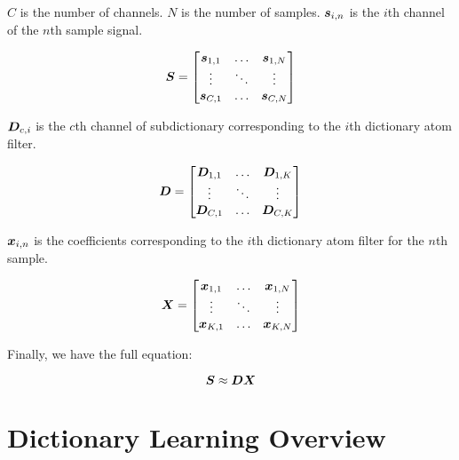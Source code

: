 \documentclass{article}
\begin{document}
$C$ is the number of channels.
$N$ is the number of samples.
$\bm{s}_{i,n}$ is the $i$th channel of the $n$th sample signal.

\begin{equation}
\begin{aligned}
\bm{S} = \begin{bmatrix} \bm{s}_{1,1} & \hdots & \bm{s}_{1,N} \\
                      \vdots & \ddots & \vdots \\
                      \bm{s}_{C,1} & \hdots & \bm{s}_{C,N}
      \end{bmatrix}
\end{aligned}
\end{equation}

$\bm{D}_{c,i}$ is the $c$th channel of subdictionary corresponding to the $i$th dictionary atom filter.

\begin{equation}
\begin{aligned}
\bm{D} = \begin{bmatrix} \bm{D}_{1,1} & \hdots & \bm{D}_{1,K} \\
                      \vdots & \ddots & \vdots \\
                      \bm{D}_{C,1} & \hdots & \bm{D}_{C,K}
      \end{bmatrix}
\end{aligned}
\end{equation}

$\bm{x}_{i,n}$ is the coefficients corresponding to the $i$th dictionary atom filter for the $n$th sample.

\begin{equation}
\bm{X} = \begin{bmatrix} \bm{x}_{1,1} & \hdots & \bm{x}_{1,N} \\
                      \vdots & \ddots & \vdots \\ 
                      \bm{x}_{K,1} & \hdots & \bm{x}_{K,N} 
      \end{bmatrix}
\end{equation}

Finally, we have the full equation:

\begin{equation}
\bm{S} \approx \bm{D}\bm{X}
\end{equation}

\section{Dictionary Learning Overview}
\end{document}
